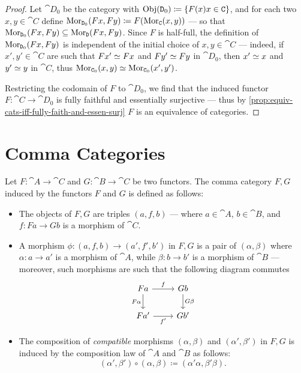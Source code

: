 \begin{proof}
    Let \(\cat D_0\) be the category with
    \(\operatorname{Obj}(\texttt D_0) \coloneq \{F(x) \relax x \in \texttt C\}\), and for each two
    \(x, y \in \cat C\) define
    \(\operatorname{Mor}_{\texttt D_0}(F x, F y) \coloneq F(\operatorname{Mor}_{\texttt C}(x, y))\) --- so that
    \(\operatorname{Mor}_{\texttt D_0}(F x, F y) \subseteq \operatorname{Mor}_{\texttt D}(F x, F y)\). Since \(F\) is
    half-full, the definition of \(\operatorname{Mor}_{\texttt D_0}(F x, F y)\) is independent of the
    initial choice of \(x, y \in \cat C\) --- indeed, if \(x', y' \in \cat C\) are
    such that \(F x' \simeq F x\) and \(F y' \simeq F y\) in \(\cat D_0\), then \(x'
    \simeq x\) and \(y' \simeq y\) in \(\cat C\), thus \(\operatorname{Mor}_{\texttt C_0}(x, y) \simeq
    \operatorname{Mor}_{\texttt C_0}(x', y')\).

    Restricting the codomain of \(F\) to \(\cat D_0\), we find that the induced
    functor \(F: \cat C \to \cat D_0\) is fully faithful and essentially surjective
    --- thus by \cref{prop:equiv-cats-iff-fully-faith-and-essen-surj} \(F\) is an
    equivalence of categories.
\end{proof}

\section{Comma Categories}

\begin{definition}
    \label{def:comma-category}
    Let \(F: \cat A \to \cat C\) and \(G: \cat B \to \cat C\) be two functors. The
    comma category \(F \comma G\) induced by the functors \(F\) and \(G\) is defined
    as follows:
    \begin{itemize}\setlength\itemsep{0em}
        \item The objects of \(F \comma G\) are triples \((a, f, b)\) --- where
              \(a \in \cat A\), \(b \in \cat B\), and \(f: F a \to G b\) is a morphism of
              \(\cat C\).

        \item A morphism \(\phi: (a, f, b) \to (a', f', b')\) in \(F \comma G\) is a
              pair of \((\alpha, \beta)\) where \(\alpha: a \to a'\) is a morphism of
              \(\cat A\), while \(\beta: b \to b'\) is a morphism of \(\cat B\) ---
              moreover, such morphisms are such that the following diagram commutes
              \[
                  \begin{tikzcd}
                      F a \ar[r, "f"] \ar[d, "F \alpha"'] & G b \ar[d, "G \beta"] \\
                      F a' \ar[r, "f'"'] & G b'
                  \end{tikzcd}
              \]

        \item The composition of \emph{compatible} morphisms \((\alpha, \beta)\) and
              \((\alpha', \beta')\) in \(F \comma G\) is induced by the composition law of
              \(\cat A\) and \(\cat B\) as follows:
              \[
                  (\alpha', \beta') \circ (\alpha, \beta)
                  \coloneq (\alpha' \alpha, \beta' \beta).
              \]
    \end{itemize}
\end{definition}

